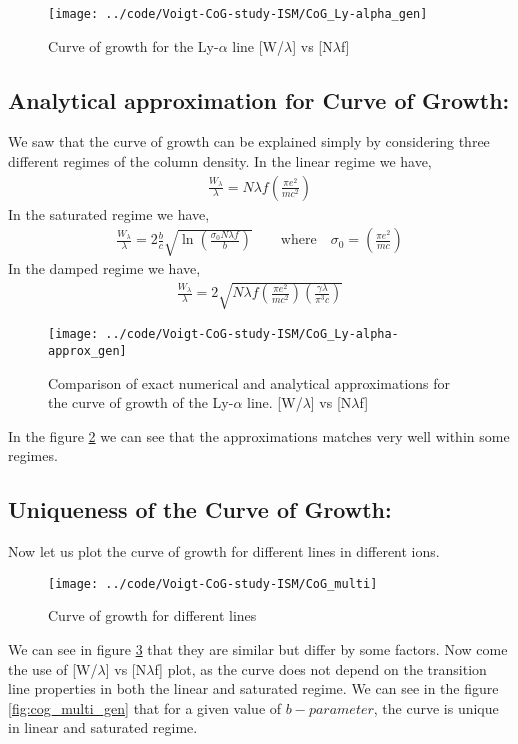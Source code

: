 \documentclass[12pt]{article}
\begin{document}
\begin{figure}[H]
\centering
\texttt{[image: ../code/Voigt-CoG-study-ISM/CoG\_Ly-alpha\_gen]}
\caption{Curve of growth for the Ly-$\alpha$ line [W/$\lambda$] vs [N$\lambda$f]}
\label{fig:cog-ly-alpha_gen}
\end{figure}




\subsection{Analytical approximation for Curve of Growth:}
\label{sec:approx}
We saw that the curve of growth can be explained simply by considering three different regimes of the column density.
In the linear regime we have,
\begin{align}
\frac{W_{\lambda}}{\lambda} = N \lambda f \left( \frac{\pi e^2}{mc^2} \right) 
\end{align}
In the saturated regime we have,
\begin{align}
\frac{W_{\lambda}}{\lambda} = 2 \frac{b}{c} \sqrt{\ln \left( \frac{\sigma_{0} N \lambda f}{b}\right) } \qquad \text{where} \quad \sigma_{0} = \left( \frac{\pi e^2}{mc} \right) 
\end{align}
In the damped regime we have,
\begin{align}
\frac{W_{\lambda}}{\lambda} = 2 \sqrt{ N \lambda f \left( \frac{\pi e^2}{mc^2} \right) \left( \frac{\gamma \lambda}{\pi^3c} \right)  }
\end{align}

\begin{figure}[H]
	\centering
	\texttt{[image: ../code/Voigt-CoG-study-ISM/CoG\_Ly-alpha-approx\_gen]}
	\caption{Comparison of exact numerical and analytical approximations for the curve of growth of the Ly-$\alpha$ line. [W/$\lambda$] vs [N$\lambda$f]}
	\label{fig:cogly-alpha-approxgen}
\end{figure}
In the figure \ref{fig:cogly-alpha-approxgen} we can see that the approximations matches very well within some regimes.

\newpage

\subsection{Uniqueness of the Curve of Growth:}
Now let us plot the curve of growth for different lines in different ions. 
\begin{figure}[H]
	\centering
	\texttt{[image: ../code/Voigt-CoG-study-ISM/CoG\_multi]}
	\caption{Curve of growth for different lines}
	\label{fig:cog_multi}
\end{figure}
We can see in figure \ref{fig:cog_multi} that they are similar but differ by some factors. Now come the use of [W/$\lambda$] vs [N$\lambda$f] plot, as the curve does not depend on the transition line properties in both the linear and saturated regime. We can see  in the figure \ref{fig:cog_multi_gen} that for a given value of $b-parameter$, the curve is unique in linear and saturated regime.
\end{document}
